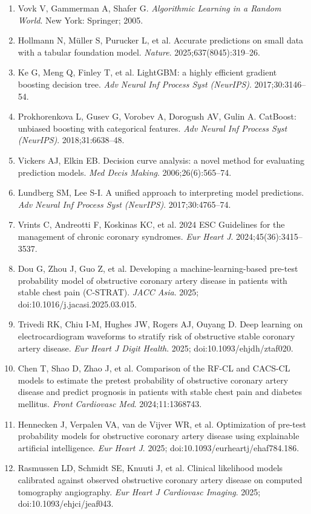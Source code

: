 \documentclass[
  english,
  11pt,
]{article}
\begin{document}
\begin{enumerate}
  a multivariable prediction model for Individual Prognosis Or Diagnosis
  (TRIPOD): the TRIPOD statement. \emph{BMJ}. 2015;350:g7594.
\item
  Vovk V, Gammerman A, Shafer G. \emph{Algorithmic Learning in a Random
  World}. New York: Springer; 2005.
\item
  Hollmann N, Müller S, Purucker L, et al. Accurate predictions on small
  data with a tabular foundation model. \emph{Nature}.
  2025;637(8045):319--26.
\item
  Ke G, Meng Q, Finley T, et al. LightGBM: a highly efficient gradient
  boosting decision tree. \emph{Adv Neural Inf Process Syst (NeurIPS)}.
  2017;30:3146--54.
\item
  Prokhorenkova L, Gusev G, Vorobev A, Dorogush AV, Gulin A. CatBoost:
  unbiased boosting with categorical features. \emph{Adv Neural Inf
  Process Syst (NeurIPS)}. 2018;31:6638--48.
\item
  Vickers AJ, Elkin EB. Decision curve analysis: a novel method for
  evaluating prediction models. \emph{Med Decis Making}.
  2006;26(6):565--74.
\item
  Lundberg SM, Lee S-I. A unified approach to interpreting model
  predictions. \emph{Adv Neural Inf Process Syst (NeurIPS)}.
  2017;30:4765--74.
\item
  Vrints C, Andreotti F, Koskinas KC, et al. 2024 ESC Guidelines for the
  management of chronic coronary syndromes. \emph{Eur Heart J}.
  2024;45(36):3415--3537.
\item
  Dou G, Zhou J, Guo Z, et al. Developing a machine-learning-based
  pre-test probability model of obstructive coronary artery disease in
  patients with stable chest pain (C-STRAT). \emph{JACC Asia}.
  2025; doi:10.1016/j.jacasi.2025.03.015.
\item
  Trivedi RK, Chiu I-M, Hughes JW, Rogers AJ, Ouyang D. Deep learning on
  electrocardiogram waveforms to stratify risk of obstructive stable
  coronary artery disease. \emph{Eur Heart J Digit Health}. 2025;
  doi:10.1093/ehjdh/ztaf020.
\item
  Chen T, Shao D, Zhao J, et al. Comparison of the RF-CL and CACS-CL
  models to estimate the pretest probability of obstructive coronary
  artery disease and predict prognosis in patients with stable chest
  pain and diabetes mellitus. \emph{Front Cardiovasc Med}. 2024;11:1368743.
\item
  Hennecken J, Verpalen VA, van de Vijver WR, et al. Optimization of
  pre-test probability models for obstructive coronary artery disease
  using explainable artificial intelligence. \emph{Eur Heart J}.
  2025; doi:10.1093/eurheartj/ehaf784.186.
\item
  Rasmussen LD, Schmidt SE, Knuuti J, et al. Clinical likelihood models
  calibrated against observed obstructive coronary artery disease on
  computed tomography angiography. \emph{Eur Heart J Cardiovasc Imaging}.
  2025; doi:10.1093/ehjci/jeaf043.
\end{enumerate}
\end{document}
